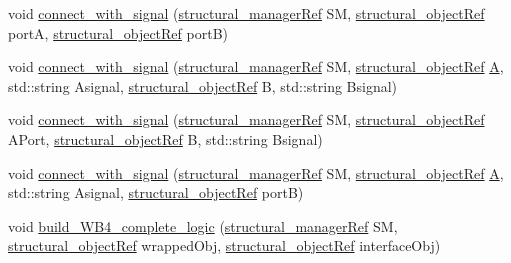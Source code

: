 \begin{DoxyCompactItemize}
void \hyperlink{classWB4__interface_ac4a503a75aef89a9cfd1927cccd37c6b}{connect\+\_\+with\+\_\+signal} (\hyperlink{structural__manager_8hpp_ab3136f0e785d8535f8d252a7b53db5b5}{structural\+\_\+manager\+Ref} SM, \hyperlink{structural__objects_8hpp_a8ea5f8cc50ab8f4c31e2751074ff60b2}{structural\+\_\+object\+Ref} portA, \hyperlink{structural__objects_8hpp_a8ea5f8cc50ab8f4c31e2751074ff60b2}{structural\+\_\+object\+Ref} portB)
\item 
void \hyperlink{classWB4__interface_ab9486d63109bdb72a6b342e39bd50777}{connect\+\_\+with\+\_\+signal} (\hyperlink{structural__manager_8hpp_ab3136f0e785d8535f8d252a7b53db5b5}{structural\+\_\+manager\+Ref} SM, \hyperlink{structural__objects_8hpp_a8ea5f8cc50ab8f4c31e2751074ff60b2}{structural\+\_\+object\+Ref} \hyperlink{tutorial__pnnl__2019_2memory_2third_2solution_2mips_8c_a5bbae38a6853eac231d3bb734d82fe8f}{A}, std\+::string Asignal, \hyperlink{structural__objects_8hpp_a8ea5f8cc50ab8f4c31e2751074ff60b2}{structural\+\_\+object\+Ref} B, std\+::string Bsignal)
\item 
void \hyperlink{classWB4__interface_a1907373293fa2624bdb543f6e2dea8ac}{connect\+\_\+with\+\_\+signal} (\hyperlink{structural__manager_8hpp_ab3136f0e785d8535f8d252a7b53db5b5}{structural\+\_\+manager\+Ref} SM, \hyperlink{structural__objects_8hpp_a8ea5f8cc50ab8f4c31e2751074ff60b2}{structural\+\_\+object\+Ref} A\+Port, \hyperlink{structural__objects_8hpp_a8ea5f8cc50ab8f4c31e2751074ff60b2}{structural\+\_\+object\+Ref} B, std\+::string Bsignal)
\item 
void \hyperlink{classWB4__interface_afc00c384ae6bf15c37a096f03693f026}{connect\+\_\+with\+\_\+signal} (\hyperlink{structural__manager_8hpp_ab3136f0e785d8535f8d252a7b53db5b5}{structural\+\_\+manager\+Ref} SM, \hyperlink{structural__objects_8hpp_a8ea5f8cc50ab8f4c31e2751074ff60b2}{structural\+\_\+object\+Ref} \hyperlink{tutorial__pnnl__2019_2memory_2third_2solution_2mips_8c_a5bbae38a6853eac231d3bb734d82fe8f}{A}, std\+::string Asignal, \hyperlink{structural__objects_8hpp_a8ea5f8cc50ab8f4c31e2751074ff60b2}{structural\+\_\+object\+Ref} portB)
\item 
void \hyperlink{classWB4__interface_abd624e3f9aa8be81278be30e7099f88b}{build\+\_\+\+W\+B4\+\_\+complete\+\_\+logic} (\hyperlink{structural__manager_8hpp_ab3136f0e785d8535f8d252a7b53db5b5}{structural\+\_\+manager\+Ref} SM, \hyperlink{structural__objects_8hpp_a8ea5f8cc50ab8f4c31e2751074ff60b2}{structural\+\_\+object\+Ref} wrapped\+Obj, \hyperlink{structural__objects_8hpp_a8ea5f8cc50ab8f4c31e2751074ff60b2}{structural\+\_\+object\+Ref} interface\+Obj)
\end{DoxyCompactItemize}
